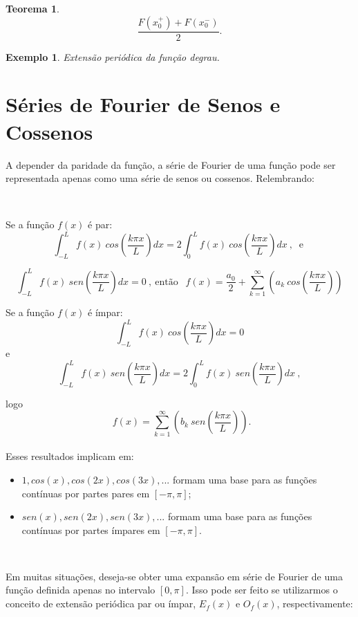\documentclass[a4paper,portuguese,9pt,final]{extarticle}
\newtheorem{theorem}{Teorema}[section]
\newtheorem{example}{Exemplo}[section]
\begin{document}
\begin{multicols*}{2}
\begin{theorem}
                $$  \frac{F(x_{0}^{+})+F(x_{0}^{-})}{2}.$$
            \end{theorem}

            \begin{example}	
                Extensão periódica da função degrau.
            \end{example}

    \section{Séries de Fourier de Senos e Cossenos}

        A depender da paridade da função, a série de Fourier de uma função pode ser representada apenas como uma série de senos ou cossenos. Relembrando: 

        \

        Se a função $f(x)$ é par:
        $$ \int_{-L}^{L} f(x)\ cos\left(\frac{k\pi x}{L}\right) dx = 2 \int_{0}^{L} f(x)\ cos\left(\frac{k\pi x}{L}\right)dx\ ,\ \mbox{ e } $$

        $$\int_{-L}^{L}f(x)\ sen\left(\frac{k\pi x}{L}\right) dx =0 \ ,\ \mbox{então }\ \ f(x) = \frac{a_{0}}{2} + \sum_{k=1}^{\infty}(a_{k} \  cos\left(\frac{k\pi x}{L}\right))  $$ 

        Se a função $f(x)$ é ímpar:
        $$ \int_{-L}^{L} f(x)\ cos\left(\frac{k\pi x}{L}\right) dx = 0 $$  e  $$ \int_{-L}^{L} f(x)\ sen\left(\frac{k\pi x}{L}\right) dx =2 \int_{0}^{L} f(x)\ sen\left(\frac{k\pi x}{L}\right)dx\ ,$$

        logo $$\ \ f(x) =  \sum_{k=1}^{\infty}(b_{k} \  sen\left(\frac{k\pi x}{L}\right)).    $$ \\ 

        Esses resultados implicam em:
        \begin{itemize}
            \item $ 1, cos(x), cos(2x), cos(3x), ... $ formam uma base para as funções contínuas por partes pares em $ [-\pi,\pi] $;
            \item $ sen(x), sen(2x), sen(3x), ... $ formam uma base para as funções contínuas por partes ímpares em $ [-\pi,\pi] $.
        \end{itemize}\


        Em muitas situações, deseja-se obter uma expansão em série de Fourier de uma função definida apenas no intervalo $ [0,\pi] $. Isso pode ser feito se utilizarmos o conceito de extensão periódica par ou ímpar, $ E_{f}(x) $ e $ O_{f}(x) $, respectivamente:


\end{multicols*}
\end{document}
